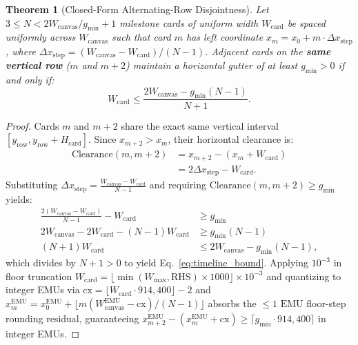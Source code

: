 \documentclass[10pt,journal,compsoc]{IEEEtran}
\newtheorem{theorem}{Theorem}
\begin{document}
\begin{theorem}[Closed-Form Alternating-Row Disjointness]
\label{thm:timeline}
Let $3 \le N < 2 W_{\text{canvas}} / g_{\min} + 1$ milestone cards of uniform width $W_{\text{card}}$ be spaced uniformly across $W_{\text{canvas}}$ such that card $m$ has left coordinate $x_m = x_0 + m \cdot \Delta x_{\text{step}}$, where $\Delta x_{\text{step}} = (W_{\text{canvas}} - W_{\text{card}}) / (N - 1)$. Adjacent cards on the \textbf{same vertical row} ($m$ and $m+2$) maintain a horizontal gutter of at least $g_{\min} > 0$ if and only if:
\begin{equation}
    W_{\text{card}} \le \frac{2 W_{\text{canvas}} - g_{\min}(N - 1)}{N + 1}.
    \label{eq:timeline_bound}
\end{equation}
\end{theorem}
\begin{proof}
Cards $m$ and $m+2$ share the exact same vertical interval $[y_{\text{row}}, y_{\text{row}} + H_{\text{card}}]$. Since $x_{m+2} > x_m$, their horizontal clearance is:
\begin{equation*}
\begin{aligned}
    \text{Clearance}(m, m+2) &= x_{m+2} - (x_m + W_{\text{card}}) \\
    &= 2 \Delta x_{\text{step}} - W_{\text{card}}.
\end{aligned}
\end{equation*}
Substituting $\Delta x_{\text{step}} = \frac{W_{\text{canvas}} - W_{\text{card}}}{N - 1}$ and requiring $\text{Clearance}(m, m+2) \ge g_{\min}$ yields:
\begin{align*}
    \frac{2(W_{\text{canvas}} - W_{\text{card}})}{N - 1} - W_{\text{card}} &\ge g_{\min} \\
    2 W_{\text{canvas}} - 2 W_{\text{card}} - (N - 1) W_{\text{card}} &\ge g_{\min}(N - 1) \\
    (N + 1) W_{\text{card}} &\le 2 W_{\text{canvas}} - g_{\min}(N - 1),
\end{align*}
which divides by $N + 1 > 0$ to yield Eq.~\eqref{eq:timeline_bound}. Applying $10^{-3}\text{ in}$ floor truncation $W_{\text{card}} = \lfloor \min(W_{\max}, \text{RHS}) \times 1000 \rfloor \times 10^{-3}$ and quantizing to integer EMUs via $\text{cx} = \lfloor W_{\text{card}} \cdot 914{,}400 \rfloor - 2$ and $x_m^{\text{EMU}} = x_0^{\text{EMU}} + \lfloor m (W_{\text{canvas}}^{\text{EMU}} - \text{cx}) / (N - 1) \rfloor$ absorbs the $\le 1\text{ EMU}$ floor-step rounding residual, guaranteeing $x_{m+2}^{\text{EMU}} - (x_m^{\text{EMU}} + \text{cx}) \ge \lceil g_{\min} \cdot 914{,}400 \rceil$ in integer EMUs.
\end{proof}
\end{document}
